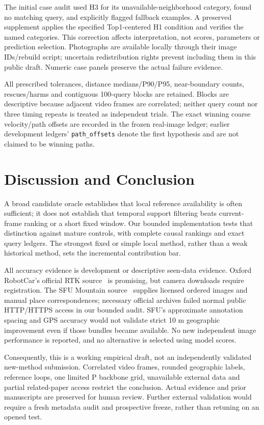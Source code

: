 \documentclass[conference]{IEEEtran}
\begin{document}
The initial case audit used H3 for its unavailable-neighborhood category, found no matching query, and explicitly flagged fallback examples. A preserved supplement applies the specified Top1-centered H1 condition and verifies the named categories. This correction affects interpretation, not scores, parameters or prediction selection. Photographs are available locally through their image IDs/rebuild script; uncertain redistribution rights prevent including them in this public draft. Numeric case panels preserve the actual failure evidence.

All prescribed tolerances, distance medians/P90/P95, near-boundary counts, rescues/harms and contiguous 100-query blocks are retained. Blocks are descriptive because adjacent video frames are correlated; neither query count nor three timing repeats is treated as independent trials. The exact winning coarse velocity/path offsets are recorded in the frozen real-image ledger; earlier development ledgers' \texttt{path\_offsets} denote the first hypothesis and are not claimed to be winning paths.

\section{Discussion and Conclusion}
A broad candidate oracle establishes that local reference availability is often sufficient; it does not establish that temporal support filtering beats current-frame ranking or a short fixed window. Our bounded implementation tests that distinction against mature controls, with complete causal rankings and exact query ledgers. The strongest fixed or simple local method, rather than a weak historical method, sets the incremental contribution bar.

All accuracy evidence is development or descriptive seen-data evidence. Oxford RobotCar's official RTK source~\cite{robotcar} is promising, but camera downloads require registration. The SFU Mountain source~\cite{sfu} supplies licensed ordered images and manual place correspondences; necessary official archives failed normal public HTTP/HTTPS access in our bounded audit. SFU's approximate annotation spacing and GPS accuracy would not validate strict 10 m geographic improvement even if those bundles became available. No new independent image performance is reported, and no alternative is selected using model scores.

Consequently, this is a working empirical draft, not an independently validated new-method submission. Correlated video frames, rounded geographic labels, reference loops, one limited P backbone grid, unavailable external data and partial related-paper access restrict the conclusion. Actual evidence and prior manuscripts are preserved for human review. Further external validation would require a fresh metadata audit and prospective freeze, rather than retuning on an opened test.
\end{document}
